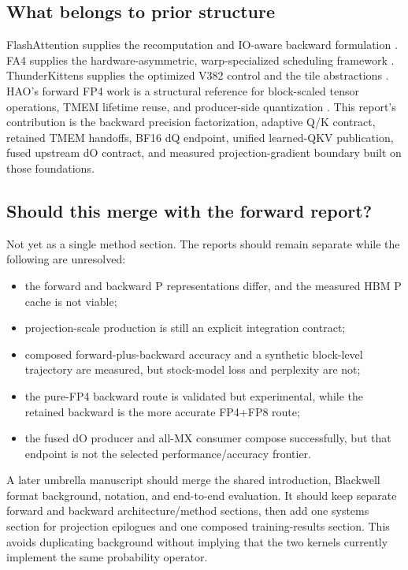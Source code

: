 \subsection{What belongs to prior structure}

FlashAttention supplies the recomputation and IO-aware backward formulation
\cite{dao2022flashattention}.  FA4 supplies the hardware-asymmetric,
warp-specialized scheduling framework \cite{zadouri2026flashattention4}.
ThunderKittens supplies the optimized V382 control and the tile abstractions
\cite{thunderkittens}.  HAO's forward FP4 work is a structural reference for
block-scaled tensor operations, TMEM lifetime reuse, and producer-side
quantization \cite{hao2026fp4flashattention}.  This report's contribution is
the backward precision factorization, adaptive Q/K contract, retained TMEM
handoffs, BF16 dQ endpoint, unified learned-QKV publication, fused upstream dO
contract, and measured projection-gradient boundary built on those
foundations.

\subsection{Should this merge with the forward report?}

Not yet as a single method section.  The reports should remain separate while
the following are unresolved:

\begin{itemize}
  \item the forward and backward P representations differ, and the measured
  HBM P cache is not viable;
  \item projection-scale production is still an explicit integration
  contract;
  \item composed forward-plus-backward accuracy and a synthetic block-level
  trajectory are measured, but stock-model loss and perplexity are not;
  \item the pure-FP4 backward route is validated but experimental, while the
  retained backward is the more accurate FP4+FP8 route;
  \item the fused dO producer and all-MX consumer compose successfully, but
  that endpoint is not the selected performance/accuracy frontier.
\end{itemize}

A later umbrella manuscript should merge the shared introduction, Blackwell
format background, notation, and end-to-end evaluation.  It should keep
separate forward and backward architecture/method sections, then add one
systems section for projection epilogues and one composed training-results
section.  This avoids duplicating background without implying that the two
kernels currently implement the same probability operator.
